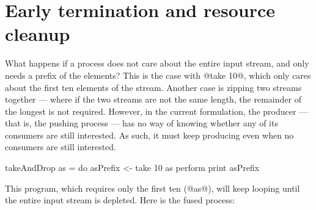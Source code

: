 % 


\section{Early termination and resource cleanup}
What happens if a process does not care about the entire input stream, and only needs a prefix of the elements?
This is the case with @take 10@, which only cares about the first ten elements of the stream.
Another case is zipping two streams together --- where if the two streams are not the same length, the remainder of the longest is not required.
However, in the current formulation, the producer --- that is, the pushing process --- has no way of knowing whether any of its consumers are still interested.
As such, it must keep producing even when no consumers are still interested.

\begin{code}
takeAndDrop as = do
  asPrefix <- take 10 as
  perform print asPrefix
\end{code}

This program, which requires only the first ten (@as@), will keep looping until the entire input stream is depleted. Here is the fused process:

